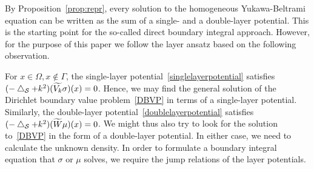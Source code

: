 By Proposition~\ref{prop:repr}, every solution to the homogeneous
Yukawa-Beltrami equation can be written as the sum of a single- and a
double-layer potential.  This  is the starting point for the so-called
direct boundary integral approach. However, for the purpose of this
paper we follow the layer ansatz based on the following observation.

For $x \in \Omega, x \notin \Gamma$, the single-layer
potential~\eqref{singlelayerpotential} satisfies $(-\bigtriangleup_{\mathcal{S}} + k^{2})
(\widetilde{V_k}\sigma)(x)=0$.  Hence, we may find the general solution
of the Dirichlet boundary value problem~\eqref{DBVP} in terms of a
single-layer potential.  Similarly, the double-layer
potential~\eqref{doublelayerpotential} satisfies $(-\bigtriangleup_{\mathcal{S}} +
k^2)(\widetilde{W}\mu)(x)=0$.  We might thus also try to look for the
solution to~\eqref{DBVP} in the form of a double-layer potential.  In
either case, we need to calculate the unknown density.  In order to
formulate a boundary integral equation that $\sigma$ or $\mu$ solves,
we require the jump relations of the layer potentials.




